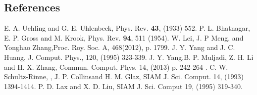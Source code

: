 \documentclass[twoside,twocolumn,prc,floats,amsmath,amssymb]{revtex4} %
\begin{document}
\vspace*{-.25cm}
\begin{thebibliography}{1}
\section{References}
 E. A. Uehling and G. E. Uhlenbeck, Phys. Rev. {\bf 43}, (1933) 552. 
 P. L. Bhatnagar, E. P. Gross and M. Krook, Phys. Rev. {\bf 94}, 511 (1954).
 W. Lei, J. P Meng, and Yonghao Zhang,Proc. Roy. Soc. A, 468(2012), p. 1799.
 J. Y. Yang and J. C. Huang, J. Comput. Phys., 120, (1995) 323-339.
 J. Y. Yang,B. P. Muljadi, Z. H. Li and H. X. Zhang, Commun. Comput. Phys. 14, (2013) p. 242-264 .
 C. W. Schultz-Rinne, , J. P. Collinsand H. M. Glaz, SIAM J. Sci. Comput. 14, (1993) 1394-1414.
 P. D. Lax and X. D. Liu, SIAM J. Sci. Comput 19, (1995) 319-340.

\end{thebibliography}
%
\end{document}
